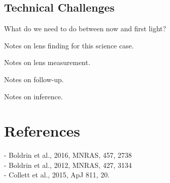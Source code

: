 \documentclass{article}
\begin{document}
\subsection{Technical Challenges}

What do we need to do between now and first light?

Notes on lens finding for this science case.

Notes on lens measurement.

Notes on follow-up.

Notes on inference.



\section{References}

- Boldrin et al., 2016, MNRAS, 457, 2738\\
- Boldrin et al., 2012, MNRAS, 427, 3134\\
- Collett et al., 2015, ApJ 811, 20.\\
\end{document}
